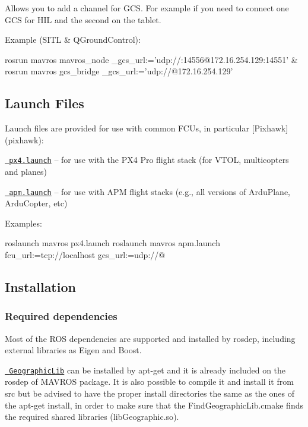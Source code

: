 Allows you to add a channel for G\+CS. For example if you need to connect one G\+CS for H\+IL and the second on the tablet.

Example (S\+I\+TL \& Q\+Ground\+Control)\+: \begin{DoxyVerb}rosrun mavros mavros_node _gcs_url:='udp://:14556@172.16.254.129:14551' &
rosrun mavros gcs_bridge _gcs_url:='udp://@172.16.254.129'
\end{DoxyVerb}


\subsection*{Launch Files }

Launch files are provided for use with common F\+C\+Us, in particular \mbox{[}Pixhawk\mbox{]}(pixhawk)\+:


\begin{DoxyItemize}
\item \href{launch/px4.launch}{\texttt{ px4.\+launch}} -- for use with the P\+X4 Pro flight stack (for V\+T\+OL, multicopters and planes)
\item \href{launch/apm.launch}{\texttt{ apm.\+launch}} -- for use with A\+PM flight stacks (e.\+g., all versions of Ardu\+Plane, Ardu\+Copter, etc)
\end{DoxyItemize}

Examples\+: \begin{DoxyVerb}roslaunch mavros px4.launch
roslaunch mavros apm.launch fcu_url:=tcp://localhost gcs_url:=udp://@
\end{DoxyVerb}


\subsection*{Installation }

\subsubsection*{Required dependencies}

Most of the R\+OS dependencies are supported and installed by {\ttfamily rosdep}, including external libraries as Eigen and Boost.

\href{https://geographiclib.sourceforge.io/}{\texttt{ Geographic\+Lib}} can be installed by {\ttfamily apt-\/get} and it is already included on the rosdep of M\+A\+V\+R\+OS package. It is also possible to compile it and install it from src but be advised to have the proper install directories the same as the ones of the {\ttfamily apt-\/get} install, in order to make sure that the {\ttfamily Find\+Geographic\+Lib.\+cmake} finds the required shared libraries ({\ttfamily lib\+Geographic.\+so}).

